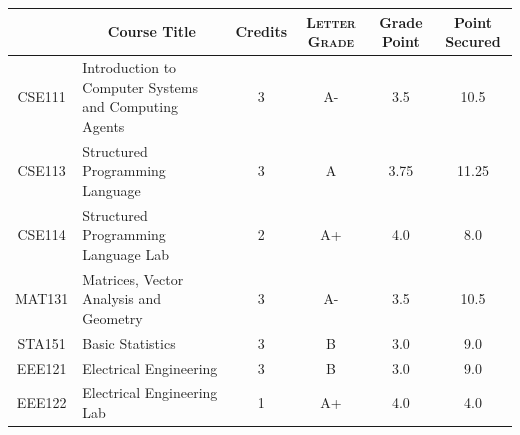 \documentclass[11pt]{article}
\newcommand*{\numtwo}[1]{\pgfmathprintnumber[
                    fixed, precision=2, fixed zerofill=true]{#1}}
\begin{document}
                \begin{center}
                    \renewcommand{\arraystretch}{1.08}
                    
                \begin{tabular}{|c|l|c|>{\scshape}c|c|c|}
                \hline  \rule[-1ex]{0pt}{3.5ex} {\centering{\bf Course Code}} &  \multicolumn{1}{c|}{\textbf{Course Title}}  & {\bf Credits} & {\bf Letter Grade} & {\bf Grade Point} & {\bf Point Secured}  \\ 
                \hline   CSE111 &  Introduction to Computer Systems and Computing Agents		 & 3 & A- & 3.5 & 10.5 \\ %
                \hline   CSE113 &  Structured Programming Language		 & 3 & A & 3.75 & 11.25 \\ %
                \hline   CSE114 &  Structured Programming Language Lab		 & 2 & A+ & 4.0 & 8.0 \\ %
                \hline   MAT131 &  Matrices, Vector Analysis and Geometry		 & 3 & A- & 3.5 & 10.5 \\ %
                \hline   STA151 &  Basic Statistics		 & 3 & B & 3.0 & 9.0 \\ %
                \hline   EEE121 &  Electrical Engineering		 & 3 & B & 3.0 & 9.0 \\ %
                \hline   EEE122 &  Electrical Engineering Lab		 & 1 & A+ & 4.0 & 4.0 \\ %

\hline                %
                \end{tabular}
                \end{center}
                \renewcommand{\arraystretch}{1.03}
\end{document}

